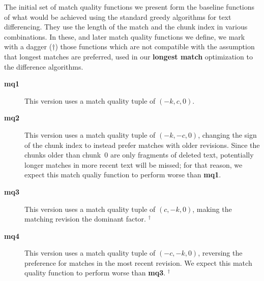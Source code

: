The initial set of match quality functions we present form the baseline
functions of what would be achieved using the standard greedy
algorithms for text differencing.
They use the length of the match and the chunk index in various
combinations.
In these, and later match quality functions we define,
we mark with a dagger ($\dagger$) those functions which are
not compatible with the assumption that longest matches are
preferred, used in our \textbf{longest match} optimization
to the difference algorithms.
%
\begin{description}
\item[\textbf{mq1}]
    This version uses a match quality tuple of $(-k, c, 0)$.

\item[\textbf{mq2}]
    This version uses a match quality tuple of $(-k, -c, 0)$,
    changing the sign of the chunk index to instead prefer
    matches with older revisions.
    Since the chunks older than chunk~0 are only fragments of
    deleted text, potentially longer matches in more recent
    text will be missed; for that reason, we expect this
    match qualiy function to perform worse than \textbf{mq1}.

\item[\textbf{mq3}]
    This version uses a match quality tuple of $(c, -k, 0)$,
    making the matching revision the dominant factor.
    ${}^\dagger$

\item[\textbf{mq4}]
    This version uses a match quality tuple of $(-c, -k, 0)$,
    reversing the preference for matches in the most recent revision.
    We expect this match quality function to perform
    worse than \textbf{mq3}.
    ${}^\dagger$

\end{description}

